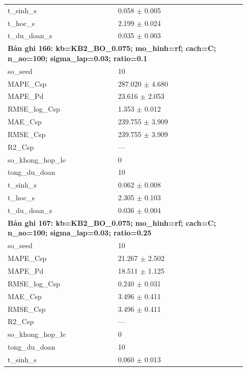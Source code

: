 \begin{longtable}{p{0.43\linewidth}p{0.50\linewidth}}
t\_\allowbreak sinh\_\allowbreak s & 0.058 $\pm$ 0.005 \\
t\_\allowbreak hoc\_\allowbreak s & 2.199 $\pm$ 0.024 \\
t\_\allowbreak du\_\allowbreak doan\_\allowbreak s & 0.035 $\pm$ 0.003 \\
\midrule
\multicolumn{2}{p{0.95\linewidth}}{\textbf{Bản ghi 166: kb=KB2\_BO\_0.075; mo\_hinh=rf; cach=C; n\_ao=100; sigma\_lap=0.03; ratio=0.1}} \\
so\_\allowbreak seed & 10 \\
MAPE\_\allowbreak Csp & 287.020 $\pm$ 4.680 \\
MAPE\_\allowbreak Pd & 23.616 $\pm$ 2.053 \\
RMSE\_\allowbreak log\_\allowbreak Csp & 1.353 $\pm$ 0.012 \\
MAE\_\allowbreak Csp & 239.755 $\pm$ 3.909 \\
RMSE\_\allowbreak Csp & 239.755 $\pm$ 3.909 \\
R2\_\allowbreak Csp & — \\
so\_\allowbreak khong\_\allowbreak hop\_\allowbreak le & 0 \\
tong\_\allowbreak du\_\allowbreak doan & 10 \\
t\_\allowbreak sinh\_\allowbreak s & 0.062 $\pm$ 0.008 \\
t\_\allowbreak hoc\_\allowbreak s & 2.305 $\pm$ 0.103 \\
t\_\allowbreak du\_\allowbreak doan\_\allowbreak s & 0.036 $\pm$ 0.004 \\
\midrule
\multicolumn{2}{p{0.95\linewidth}}{\textbf{Bản ghi 167: kb=KB2\_BO\_0.075; mo\_hinh=rf; cach=C; n\_ao=100; sigma\_lap=0.03; ratio=0.25}} \\
so\_\allowbreak seed & 10 \\
MAPE\_\allowbreak Csp & 21.267 $\pm$ 2.502 \\
MAPE\_\allowbreak Pd & 18.511 $\pm$ 1.125 \\
RMSE\_\allowbreak log\_\allowbreak Csp & 0.240 $\pm$ 0.031 \\
MAE\_\allowbreak Csp & 3.496 $\pm$ 0.411 \\
RMSE\_\allowbreak Csp & 3.496 $\pm$ 0.411 \\
R2\_\allowbreak Csp & — \\
so\_\allowbreak khong\_\allowbreak hop\_\allowbreak le & 0 \\
tong\_\allowbreak du\_\allowbreak doan & 10 \\
t\_\allowbreak sinh\_\allowbreak s & 0.060 $\pm$ 0.013 \\

\end{longtable}
